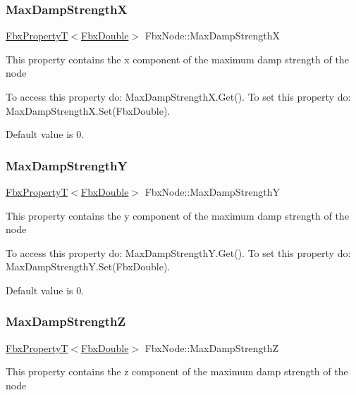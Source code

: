 \subsubsection{\texorpdfstring{Max\+Damp\+StrengthX}{MaxDampStrengthX}}
{\footnotesize\ttfamily \hyperlink{class_fbx_property_t}{Fbx\+PropertyT}$<$\hyperlink{fbxtypes_8h_a171e72a1c46fc15c1a6c9c31948c1c5b}{Fbx\+Double}$>$ Fbx\+Node\+::\+Max\+Damp\+StrengthX}

This property contains the x component of the maximum damp strength of the node

To access this property do\+: Max\+Damp\+Strength\+X.\+Get(). To set this property do\+: Max\+Damp\+Strength\+X.\+Set(\+Fbx\+Double).

Default value is 0. \mbox{\label{class_fbx_node_af62a8865505138ce889586f13535bc0e}} 
\subsubsection{\texorpdfstring{Max\+Damp\+StrengthY}{MaxDampStrengthY}}
{\footnotesize\ttfamily \hyperlink{class_fbx_property_t}{Fbx\+PropertyT}$<$\hyperlink{fbxtypes_8h_a171e72a1c46fc15c1a6c9c31948c1c5b}{Fbx\+Double}$>$ Fbx\+Node\+::\+Max\+Damp\+StrengthY}

This property contains the y component of the maximum damp strength of the node

To access this property do\+: Max\+Damp\+Strength\+Y.\+Get(). To set this property do\+: Max\+Damp\+Strength\+Y.\+Set(\+Fbx\+Double).

Default value is 0. \mbox{\label{class_fbx_node_a560c4e2acb691a960b607f9381b26681}} 
\subsubsection{\texorpdfstring{Max\+Damp\+StrengthZ}{MaxDampStrengthZ}}
{\footnotesize\ttfamily \hyperlink{class_fbx_property_t}{Fbx\+PropertyT}$<$\hyperlink{fbxtypes_8h_a171e72a1c46fc15c1a6c9c31948c1c5b}{Fbx\+Double}$>$ Fbx\+Node\+::\+Max\+Damp\+StrengthZ}

This property contains the z component of the maximum damp strength of the node

